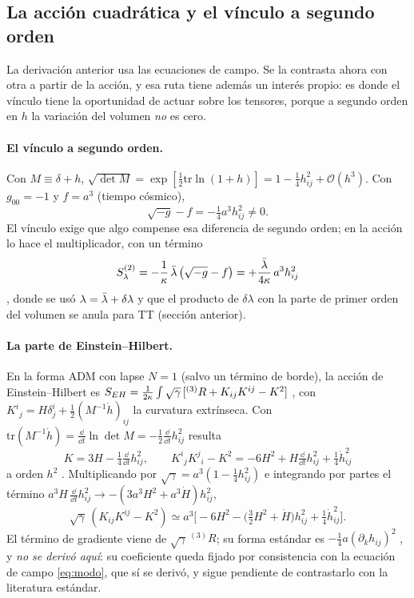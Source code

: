 \subsection{La acción cuadrática y el vínculo a segundo orden}
\label{sec:accion2}

La derivación anterior usa las ecuaciones de campo. Se la contrasta ahora con otra a partir de la acción, y esa ruta tiene además un interés propio: es donde el vínculo tiene la oportunidad de actuar sobre los tensores, porque a segundo orden en $h$ la variación del volumen \emph{no} es cero.

\paragraph{El vínculo a segundo orden.} Con $M\equiv\delta+h$, $\sqrt{\det M}=\exp[\tfrac12\mathrm{tr}\ln(1+h)]=1-\tfrac14h_{ij}^2+\mathcal O(h^3)$. Con $g_{00}=-1$ y $f=a^3$ (tiempo cósmico),
\begin{equation}
\sqrt{-g}-f=-\tfrac14a^3h_{ij}^2\neq0.
\label{eq:vinculo2}
\end{equation}
El vínculo exige que algo compense esa diferencia de segundo orden; en la acción lo hace el multiplicador, con un término
\begin{equation}
S_\lambda^{(2)}=-\frac{1}{\kappa}\,\bar\lambda\,\big(\sqrt{-g}-f\big)=+\frac{\bar\lambda}{4\kappa}\,a^3h_{ij}^2
\label{eq:Slambda2}
\end{equation}
, donde se usó $\lambda=\bar\lambda+\delta\lambda$ y que el producto de $\delta\lambda$ con la parte de primer orden del volumen se anula para TT (sección anterior).

\paragraph{La parte de Einstein--Hilbert.} En la forma ADM con lapse $N=1$ (salvo un término de borde), la acción de Einstein--Hilbert es $S_{EH}=\frac{1}{2\kappa}\int\sqrt\gamma\,[{}^{(3)}R+K_{ij}K^{ij}-K^2]$ , con $K^i{}_j=H\delta^i_j+\tfrac12(M^{-1}\dot h)_{ij}$ la curvatura extrínseca. Con $\mathrm{tr}(M^{-1}\dot h)=\tfrac{\dd}{\dd t}\ln\det M=-\tfrac12\tfrac{\dd}{\dd t}h_{ij}^2$ resulta
\begin{equation}
K=3H-\tfrac14\tfrac{\dd}{\dd t}h_{ij}^2,\qquad K^i{}_jK^j{}_i-K^2=-6H^2+H\tfrac{\dd}{\dd t}h_{ij}^2+\tfrac14\dot h_{ij}^2
\label{eq:Kh}
\end{equation}
a orden $h^2$ . Multiplicando por $\sqrt\gamma=a^3(1-\tfrac14h_{ij}^2)$ e integrando por partes el término $a^3H\,\tfrac{\dd}{\dd t}h_{ij}^2\to-(3a^3H^2+a^3\dot H)h_{ij}^2$,
\begin{equation}
\sqrt\gamma\,(K_{ij}K^{ij}-K^2)\simeq a^3\Big[-6H^2-\big(\tfrac32H^2+\dot H\big)h_{ij}^2+\tfrac14\dot h_{ij}^2\Big].
\label{eq:KKh}
\end{equation}
El término de gradiente viene de $\sqrt\gamma\,{}^{(3)}R$; su forma estándar es $-\tfrac14a(\partial_kh_{ij})^2$ , y \emph{no se derivó aquí}: su coeficiente queda fijado por consistencia con la ecuación de campo \eqref{eq:modo}, que sí se derivó, y sigue pendiente de contrastarlo con la literatura estándar.

